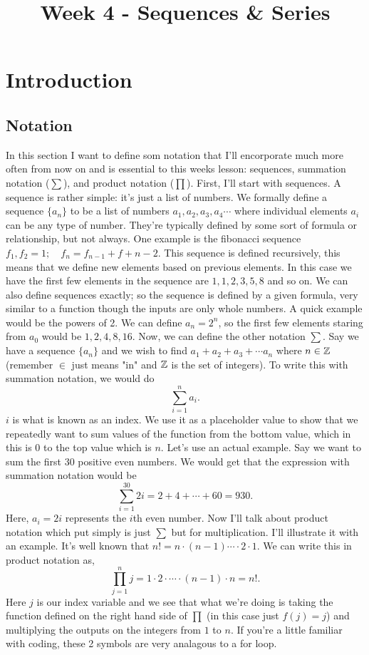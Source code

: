 \documentclass[11pt]{article}
\begin{document}
\title{Week 4 - Sequences \& Series}
\maketitle

\section*{Introduction}

\subsection*{Notation}
In this section I want to define som notation that I'll encorporate much more often from now on and is essential to this weeks lesson: sequences, summation notation ($\sum$), and product notation ($\prod$). 
\vspace{0.5cm} \newline First, I'll start with sequences. A sequence is rather simple: it's just a list of numbers. 
We formally define a sequence $\{ a_n \}$ to be a list of numbers $a_1, a_2, a_3, a_4 \cdots$ where individual elements $a_i$ can be any type of number. They're typically defined by some sort of formula or relationship, but not always. One example is the fibonacci sequence $f_1, f_2 = 1; \quad f_{n} = f_{n-1} + f+{n-2}$. This sequence is defined
recursively, this means that we define new elements based on previous elements. In this case we have the first few elements in the sequence are $1, 1, 2, 3, 5, 8$ and so on. We can also define sequences exactly; so the sequence is defined by a given formula, very similar to a function though the inputs are only whole numbers. A quick example would be the powers of 2. We can define
$a_n = 2^n$, so the first few elements staring from $a_0$ would be $1, 2, 4, 8, 16$. \vspace{0.5cm} \newline Now, we can define the other notation $\sum$. Say we have a sequence $\{a_n\}$ and we wish to find $a_1 + a_2 + a_3 + \cdots a_n$ where $n \in \mathbb Z$ (remember $\in$ just means "in" and $\mathbb Z$ is the set of integers).
To write this with summation notation, we would do 
\[
\sum_{i=1}^n a_i.
\] $i$ is what is known as an index. We use it as a placeholder value to show that we repeatedly want to sum values of the function from the bottom value, which in this is 0 to the top value which is $n$. Let's use an actual example. Say we want to sum the first 30 positive even numbers. 
We would get that the expression with summation notation would be
\[
\sum_{i=1}^{30} 2i = 2 + 4 + \cdots + 60 = 930.
\] Here, $a_i=2i$ represents the $i$th even number. \newpage Now I'll talk about product notation which put simply is just $\sum$ but for multiplication. I'll illustrate it with an example. It's well known that $n! = n \cdot (n-1) \cdots \cdot 2 \cdot 1$. We can write this in product notation as,
\[
\prod_{j=1}^n j = 1 \cdot 2 \cdot \cdots \cdot (n-1) \cdot n = n!.
\] Here $j$ is our index variable and we see that what we're doing is taking the function defined on the right hand side of $\prod$ (in this case just $f(j)=j$) and multiplying the outputs on the integers from $1$ to $n$. If you're a little familiar with coding, these 2 symbols are very analagous to a for loop.
\end{document}
